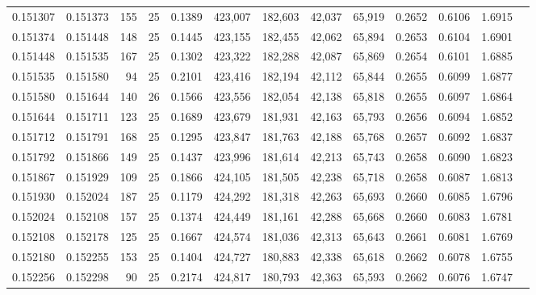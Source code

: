 \begin{tabular}{rrrrrrrrrrrrr}
0.151307 & 0.151373 &   155 &  25 &                                     0.1389 & 423,007 & 182,603 &  42,037 &  65,919 & 0.2652 & 0.6106 & 1.6915 \\
0.151374 & 0.151448 &   148 &  25 &                                     0.1445 & 423,155 & 182,455 &  42,062 &  65,894 & 0.2653 & 0.6104 & 1.6901 \\
0.151448 & 0.151535 &   167 &  25 &                                     0.1302 & 423,322 & 182,288 &  42,087 &  65,869 & 0.2654 & 0.6101 & 1.6885 \\
0.151535 & 0.151580 &    94 &  25 &                                     0.2101 & 423,416 & 182,194 &  42,112 &  65,844 & 0.2655 & 0.6099 & 1.6877 \\
0.151580 & 0.151644 &   140 &  26 &                                     0.1566 & 423,556 & 182,054 &  42,138 &  65,818 & 0.2655 & 0.6097 & 1.6864 \\
0.151644 & 0.151711 &   123 &  25 &                                     0.1689 & 423,679 & 181,931 &  42,163 &  65,793 & 0.2656 & 0.6094 & 1.6852 \\
0.151712 & 0.151791 &   168 &  25 &                                     0.1295 & 423,847 & 181,763 &  42,188 &  65,768 & 0.2657 & 0.6092 & 1.6837 \\
0.151792 & 0.151866 &   149 &  25 &                                     0.1437 & 423,996 & 181,614 &  42,213 &  65,743 & 0.2658 & 0.6090 & 1.6823 \\
0.151867 & 0.151929 &   109 &  25 &                                     0.1866 & 424,105 & 181,505 &  42,238 &  65,718 & 0.2658 & 0.6087 & 1.6813 \\
0.151930 & 0.152024 &   187 &  25 &                                     0.1179 & 424,292 & 181,318 &  42,263 &  65,693 & 0.2660 & 0.6085 & 1.6796 \\
0.152024 & 0.152108 &   157 &  25 &                                     0.1374 & 424,449 & 181,161 &  42,288 &  65,668 & 0.2660 & 0.6083 & 1.6781 \\
0.152108 & 0.152178 &   125 &  25 &                                     0.1667 & 424,574 & 181,036 &  42,313 &  65,643 & 0.2661 & 0.6081 & 1.6769 \\
0.152180 & 0.152255 &   153 &  25 &                                     0.1404 & 424,727 & 180,883 &  42,338 &  65,618 & 0.2662 & 0.6078 & 1.6755 \\
0.152256 & 0.152298 &    90 &  25 &                                     0.2174 & 424,817 & 180,793 &  42,363 &  65,593 & 0.2662 & 0.6076 & 1.6747 \\

\end{tabular}
